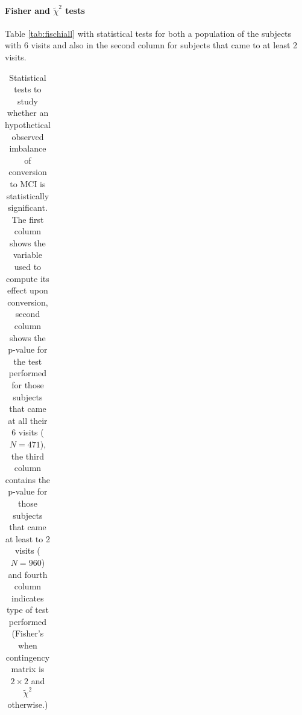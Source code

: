 \documentclass[11pt]{article}
\theoremstyle{definition}
\theoremstyle{remark}
\begin{document}
\paragraph*{Fisher and $\tilde{\chi}^2$ tests }

Table \ref{tab:fischiall} with statistical tests for both a population of the subjects with 6 visits and also in the second column for subjects that came to at least 2 visits.

\begin{table}[ht]
\caption{Statistical tests to study whether an hypothetical observed imbalance of conversion to MCI is statistically significant.
The first column shows the variable used to compute its effect upon conversion, second column shows the p-value for the test performed for those subjects that came at all their 6 visits ($N=471$), the third column contains the p-value for those subjects that came at least to 2 visits ($N=960$) and fourth column indicates type of test performed (Fisher's when contingency matrix is $2 \times 2$ and $\tilde{\chi}^2$ otherwise.) }
\centering
\begin{tabular}{ |p{3cm}||p{3cm}|p{3cm}|p{.7cm}|  }


\end{tabular}
\end{table}
\end{document}
